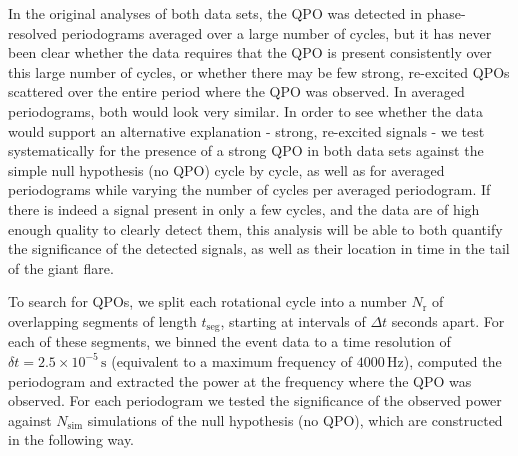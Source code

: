 \documentclass{emulateapj}
\begin{document}
In the original analyses of both data sets, the QPO was detected in phase-resolved periodograms averaged over a large number of cycles, but it has never been clear whether the data requires that the QPO is present consistently over this large number of cycles, or whether there may be few strong, re-excited QPOs scattered over the entire period where the QPO was observed. In averaged periodograms, both would look very similar.
In order to see whether the data would support an alternative explanation - strong, re-excited signals - we test systematically for the presence of a strong QPO in both data sets against the simple null hypothesis (no QPO) cycle by cycle, as well as for averaged periodograms while varying the number of cycles per averaged periodogram. If there is indeed a signal present in only a few cycles, and the data are of high enough quality to clearly detect them, this analysis will be able to both quantify the significance of the detected signals, as well as their location in time in the tail of the giant flare.

To search for QPOs, we split each rotational cycle into a number $N_\mathrm{r}$ of overlapping segments of length $t_{\mathrm{seg}}$, starting at intervals of $\Delta t$ seconds apart. For each of these segments, we binned the event data to a time resolution of $\delta t = 2.5 \times 10^{-5} \, \mathrm{s}$ (equivalent to a maximum frequency of $4000 \, \mathrm{Hz}$), computed the periodogram and extracted the power at the frequency where the QPO was observed. For each periodogram we tested the significance of the observed power against $N_{\mathrm{sim}}$ simulations of the null hypothesis (no QPO), which are constructed in the following way.
\end{document}
